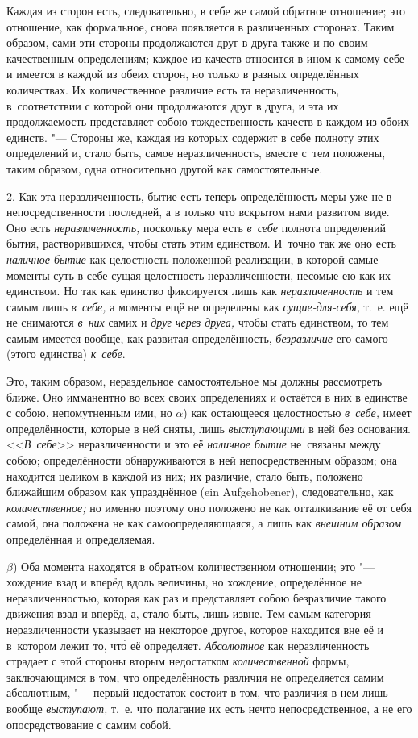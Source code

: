 Каждая из сторон есть, следовательно, в себе же самой обратное отношение; это
отношение, как формальное, снова появляется в различенных сторонах. Таким
образом, сами эти стороны продолжаются друг в друга также и по своим
качественным определениям; каждое из качеств относится в ином к самому себе и
имеется в каждой из обеих сторон, но только в разных определённых количествах.
Их количественное различие есть та неразличенность, в~соответствии с которой
они продолжаются друг в друга, и эта их продолжаемость представляет собою
тождественность качеств в каждом из обоих единств. "--- Стороны же, каждая из
которых содержит в себе полноту этих определений и, стало быть, самое
неразличенность, вместе с~тем положены, таким образом, одна относительно
другой как самостоятельные.

2. Как эта неразличенность, бытие есть теперь определённость меры уже не в
непосредственности последней, а в только что вскрытом нами развитом виде. Оно
есть {\em неразличенность,} поскольку мера есть {\em в~себе} полнота
определений бытия, растворившихся, чтобы стать этим единством. И~точно так же
оно есть {\em наличное бытие} как целостность положенной реализации, в которой
самые моменты суть в-себе-сущая целостность неразличенности, несомые ею как их
единством. Но так как единство фиксируется лишь как {\em неразличенность} и тем
самым лишь {\em в~себе,} а моменты ещё не определены как {\em сущие-для-себя,}
т.~е. ещё не снимаются {\em в~них} самих и {\em друг через друга,} чтобы стать
единством, то тем самым имеется вообще, как развитая определённость, {\em
безразличие} его самого (этого единства) {\em к~себе}.

Это, таким образом, нераздельное самостоятельное мы должны рассмотреть ближе.
Оно имманентно во всех своих определениях и остаётся в них в единстве с собою,
непомутненным ими, но $\alpha$) как остающееся целостностью {\em в~себе,} имеет
определённости, которые в ней сняты, лишь {\em выступающими} в ней без
основания. <<{\em В~себе}>> неразличенности и это её {\em наличное бытие}
не~связаны между собою; определённости обнаруживаются в ней непосредственным
образом; она находится целиком в каждой из них; их различие, стало быть,
положено ближайшим образом как упразднённое (ein Auf\-ge\-ho\-be\-ner),
следовательно, как {\em количественное;} но именно поэтому оно положено не как
отталкивание её от себя самой, она положена не как самоопределяющаяся, а лишь
как {\em внешним образом} определённая и определяемая.

$\beta$) Оба момента находятся в обратном количественном отношении; это "---
хождение взад и вперёд вдоль величины, но хождение, определённое не
неразличенностью, которая как раз и представляет собою безразличие такого
движения взад и вперёд, а, стало быть, лишь извне. Тем самым категория
неразличенности указывает на некоторое другое, которое находится вне её и
в~котором лежит то, чт\'{о} её определяет. {\em Абсолютное} как неразличенность
страдает с этой стороны вторым недостатком {\em количественной} формы,
заключающимся в том, что определённость различия не определяется самим
абсолютным, "--- первый недостаток состоит в том, что различия в нем лишь
вообще {\em выступают,} т.~е. что полагание их есть нечто непосредственное, а
не его опосредствование с самим собой.

